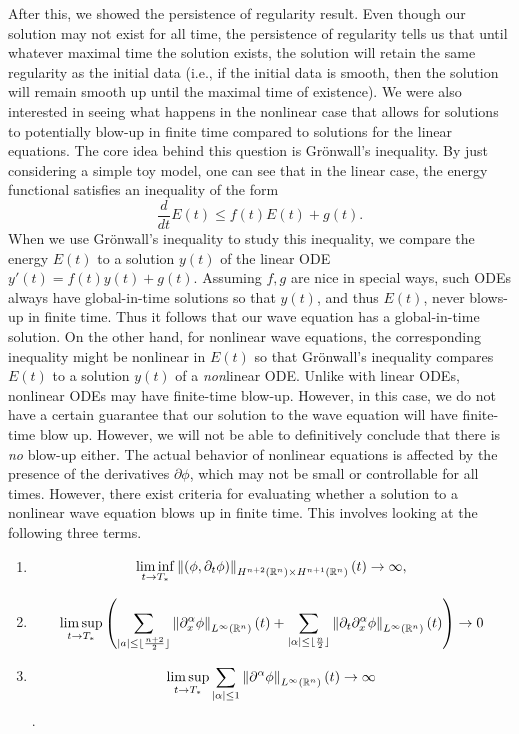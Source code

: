 \documentclass{article}
\begin{document}
	After this, we showed the persistence of regularity result. Even though our solution may not exist for all time, the persistence of regularity tells us that until whatever maximal time the solution exists, the solution will retain the same regularity as the initial data (i.e., if the initial data is smooth, then the solution will remain smooth up until the maximal time of existence). We were also interested in seeing what happens in the nonlinear case that allows for solutions to potentially blow-up in finite time compared to solutions for the linear equations. The core idea behind this question is Gr\"onwall's inequality. By just considering a simple toy model, one can see that in the linear case, the energy functional satisfies an inequality of the form 
	\begin{equation*}
		\frac{d}{dt}E(t) \leq f(t)E(t) + g(t). 
	\end{equation*} 
	When we use Gr\"onwall's inequality to study this inequality, we compare the energy $E(t)$ to a solution $y(t)$ of the linear ODE $y'(t) = f(t)y(t) + g(t)$. Assuming $f, g$ are nice in special ways, such ODEs always have global-in-time solutions so that $y(t)$, and thus $E(t)$, never blows-up in finite time. Thus it follows that our wave equation has a global-in-time solution. On the other hand, for nonlinear wave equations, the corresponding inequality might be nonlinear in $E(t)$ so that Gr\"onwall's inequality compares $E(t)$ to a solution $y(t)$ of a \textit{non}linear ODE.  Unlike with linear ODEs, nonlinear ODEs may have finite-time blow-up. However, in this case, we do not have a certain guarantee that our solution to the wave equation will have finite-time blow up. However, we will not be able to definitively conclude that there is \textit{no} blow-up either. The actual behavior of nonlinear equations is affected by the presence of the derivatives $\partial \phi$, which may not be small or controllable for all times. However, there exist criteria for evaluating whether a solution to a nonlinear wave equation blows up in finite time. This involves looking at the following three terms. \vspace{-0.25cm}
	\begin{enumerate}[itemsep=-6pt,label = (\roman{*})]
		\item $$\liminf_{t \to T_{\ast}}\left\Vert (\phi, \partial_{t}\phi) \right\Vert_{H^{n + 2}(\mathbb{R}^{n}) \times H^{n + 1}(\mathbb{R}^{n})}(t) \to \infty,$$
		\item $$\limsup_{t \to T_{\ast}}\left(\sum_{|a| \leq \lfloor \frac{n + 2}{2}\rfloor}\left\Vert \partial_{x}^{\alpha}\phi \right\Vert_{L^{\infty}(\mathbb{R}^{n})}(t) + \sum_{|\alpha| \leq \lfloor \frac{n}{2}\rfloor}\left\Vert \partial_{t}\partial_{x}^{\alpha}\phi \right\Vert_{L^{\infty}(\mathbb{R}^{n})}(t)\right) \to 0$$
		\item $$\limsup_{t \to T_{\ast}}\sum_{|\alpha|\leq 1}\left\Vert \partial^{\alpha}\phi \right\Vert_{L^{\infty}(\mathbb{R}^{n})}(t) \to \infty$$. 
	\end{enumerate}
\end{document}
